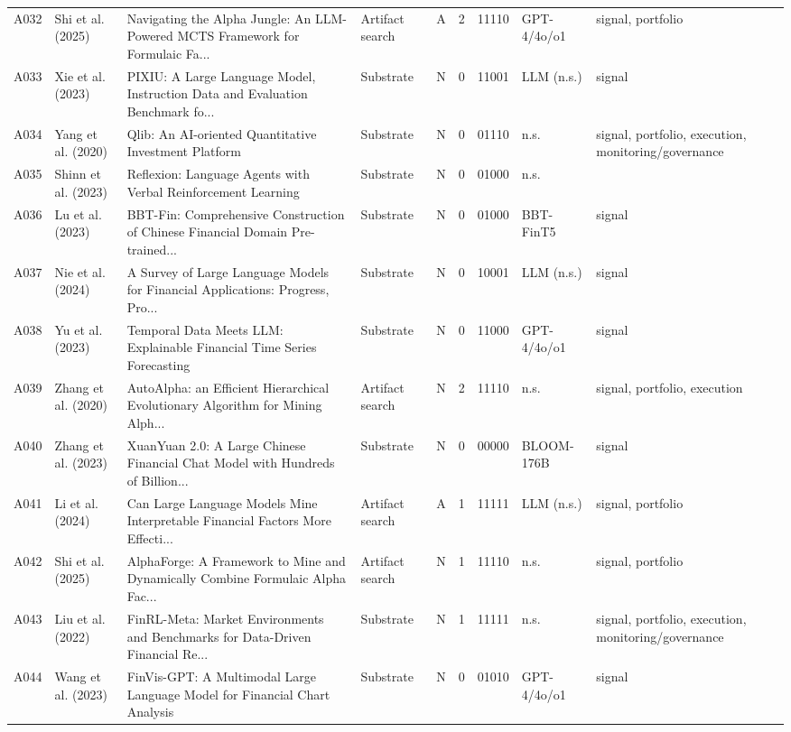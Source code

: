 \begin{longtable}{p{0.7cm} p{1.9cm} p{3.85cm} p{1.7cm} p{0.65cm} p{0.55cm} p{1.2cm} p{1.8cm} p{2.0cm}}
A032 & Shi et al. (2025) & Navigating the Alpha Jungle: An LLM-Powered MCTS Framework for Formulaic Fa... & Artifact search & A & 2 & 11110 & GPT-4/4o/o1 & signal, portfolio \\
A033 & Xie et al. (2023) & PIXIU: A Large Language Model, Instruction Data and Evaluation Benchmark fo... & Substrate & N & 0 & 11001 & LLM (n.s.) & signal \\
A034 & Yang et al. (2020) & Qlib: An AI-oriented Quantitative Investment Platform & Substrate & N & 0 & 01110 & n.s. & signal, portfolio, execution, monitoring/governance \\
A035 & Shinn et al. (2023) & Reflexion: Language Agents with Verbal Reinforcement Learning & Substrate & N & 0 & 01000 & n.s. &  \\
A036 & Lu et al. (2023) & BBT-Fin: Comprehensive Construction of Chinese Financial Domain Pre-trained... & Substrate & N & 0 & 01000 & BBT-FinT5 & signal \\
A037 & Nie et al. (2024) & A Survey of Large Language Models for Financial Applications: Progress, Pro... & Substrate & N & 0 & 10001 & LLM (n.s.) & signal \\
A038 & Yu et al. (2023) & Temporal Data Meets LLM: Explainable Financial Time Series Forecasting & Substrate & N & 0 & 11000 & GPT-4/4o/o1 & signal \\
A039 & Zhang et al. (2020) & AutoAlpha: an Efficient Hierarchical Evolutionary Algorithm for Mining Alph... & Artifact search & N & 2 & 11110 & n.s. & signal, portfolio, execution \\
A040 & Zhang et al. (2023) & XuanYuan 2.0: A Large Chinese Financial Chat Model with Hundreds of Billion... & Substrate & N & 0 & 00000 & BLOOM-176B & signal \\
A041 & Li et al. (2024) & Can Large Language Models Mine Interpretable Financial Factors More Effecti... & Artifact search & A & 1 & 11111 & LLM (n.s.) & signal, portfolio \\
A042 & Shi et al. (2025) & AlphaForge: A Framework to Mine and Dynamically Combine Formulaic Alpha Fac... & Artifact search & N & 1 & 11110 & n.s. & signal, portfolio \\
A043 & Liu et al. (2022) & FinRL-Meta: Market Environments and Benchmarks for Data-Driven Financial Re... & Substrate & N & 1 & 11111 & n.s. & signal, portfolio, execution, monitoring/governance \\
A044 & Wang et al. (2023) & FinVis-GPT: A Multimodal Large Language Model for Financial Chart Analysis & Substrate & N & 0 & 01010 & GPT-4/4o/o1 & signal \\

\end{longtable}
